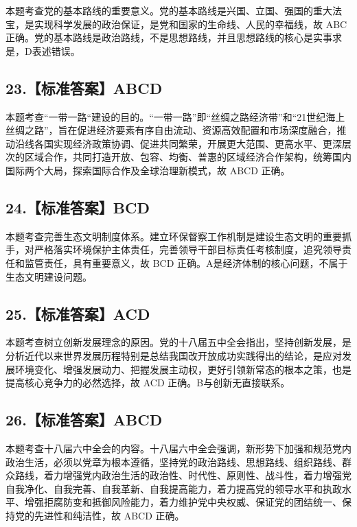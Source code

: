 \documentclass[UTF8,11pt]{ctexart}
\begin{document}
本题考查党的基本路线的重要意义。党的基本路线是兴国、立国、强国的重大法宝，是实现科学发展的政治保证，是党和国家的生命线、人民的幸福线，故 ABC 正确。党的基本路线是政治路线，不是思想路线，并且思想路线的核心是实事求是，D表述错误。


\subsection*{23.【标准答案】ABCD}

本题考查“一带一路“建设的目的。“一带一路”即“丝绸之路经济带”和“21世纪海上丝绸之路”，旨在促进经济要素有序自由流动、资源高效配置和市场深度融合，推动沿线各国实现经济政策协调、促进共同繁荣，开展更大范围、更高水平、更深层次的区域合作，共同打造开放、包容、均衡、普惠的区域经济合作架构，统筹国内国际两个大局，探索国际合作及全球治理新模式，故 ABCD 正确。


\subsection*{24.【标准答案】BCD}

本题考查完善生态文明制度体系。建立环保督察工作机制是建设生态文明的重要抓手，对严格落实环境保护主体责任，完善领导干部目标责任考核制度，追究领导责任和监管责任，具有重要意义，故 BCD 正确。A是经济体制的核心问题，不属于生态文明建设问题。


\subsection*{25.【标准答案】ACD}

本题考查树立创新发展理念的原因。党的十八届五中全会指出，坚持创新发展，是分析近代以来世界发展历程特别是总结我国改开放成功实践得出的结论，是应对发展环境变化、增强发展动力、把握发展主动权，更好引领新常态的根本之策，也是提高核心竞争力的必然选择，故 ACD 正确。B与创新无直接联系。


\subsection*{26.【标准答案】ABCD}

本题考查十八届六中全会的内容。十八届六中全会强调，新形势下加强和规范党内政治生活，必须以党章为根本遵循，坚持党的政治路线、思想路线、组织路线、群众路线，着力增强党内政治生活的政治性、时代性、原则性、战斗性，着力增强党自我净化、自我完善、自我革新、自我提高能力，着力提高党的领导水平和执政水平、增强拒腐防变和抵御风险能力，着力维护党中央权威、保证党的团结统一、保持党的先进性和纯洁性，故 ABCD 正确。
\end{document}
